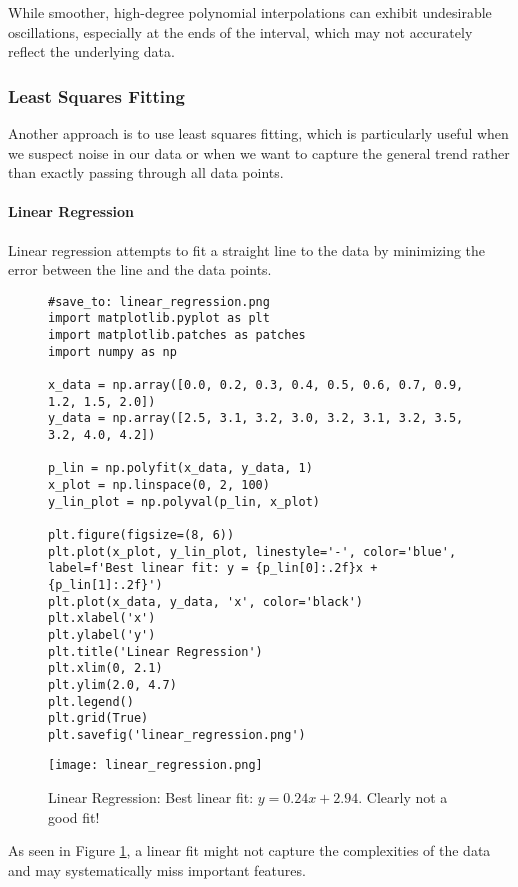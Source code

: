 \documentclass{article}
\begin{document}
While smoother, high-degree polynomial interpolations can exhibit undesirable oscillations, especially at the ends of the interval, which may not accurately reflect the underlying data.

\subsubsection{Least Squares Fitting}

Another approach is to use least squares fitting, which is particularly useful when we suspect noise in our data or when we want to capture the general trend rather than exactly passing through all data points.

\paragraph{Linear Regression}

Linear regression attempts to fit a straight line to the data by minimizing the error between the line and the data points.

\begin{figure}[h]
    \centering
    \begin{verbatim}
#save_to: linear_regression.png
import matplotlib.pyplot as plt
import matplotlib.patches as patches
import numpy as np

x_data = np.array([0.0, 0.2, 0.3, 0.4, 0.5, 0.6, 0.7, 0.9, 1.2, 1.5, 2.0])
y_data = np.array([2.5, 3.1, 3.2, 3.0, 3.2, 3.1, 3.2, 3.5, 3.2, 4.0, 4.2])

p_lin = np.polyfit(x_data, y_data, 1)
x_plot = np.linspace(0, 2, 100)
y_lin_plot = np.polyval(p_lin, x_plot)

plt.figure(figsize=(8, 6))
plt.plot(x_plot, y_lin_plot, linestyle='-', color='blue', label=f'Best linear fit: y = {p_lin[0]:.2f}x + {p_lin[1]:.2f}')
plt.plot(x_data, y_data, 'x', color='black')
plt.xlabel('x')
plt.ylabel('y')
plt.title('Linear Regression')
plt.xlim(0, 2.1)
plt.ylim(2.0, 4.7)
plt.legend()
plt.grid(True)
plt.savefig('linear_regression.png')
    \end{verbatim}
    \texttt{[image: linear\_regression.png]}
    \caption{Linear Regression: Best linear fit: \(y = 0.24x + 2.94\). Clearly not a good fit!}
    \label{fig:linear_regression}
\end{figure}

As seen in Figure \ref{fig:linear_regression}, a linear fit might not capture the complexities of the data and may systematically miss important features.
\end{document}
